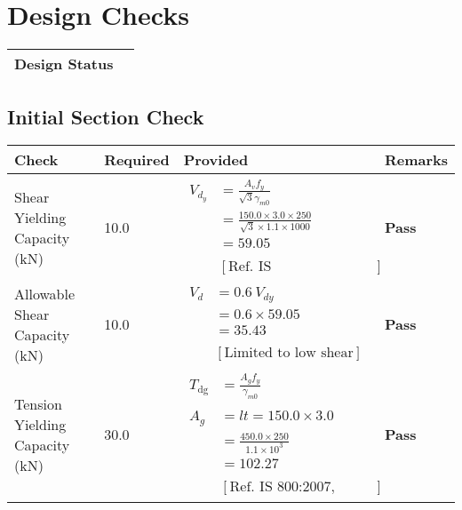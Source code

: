 \documentclass{article}%
\begin{document}
\section{Design Checks}%
\label{sec:DesignChecks}%
\renewcommand{\arraystretch}{1.2}%
\begin{tabularx}{\textwidth}{|>{\centering}p{12.5cm}|>{\centering\arraybackslash}X|}%
\hline%
\textbf{Design Status}&\cellcolor{Red}{\textbf{Fail}}\\%
\hline%
\end{tabularx}%
\subsection{Initial Section Check}%
\label{subsec:InitialSectionCheck}%
\renewcommand{\arraystretch}{1.2}%
\begin{longtable}{|p{4cm}|p{5cm}|p{5.5cm}|p{1.5cm}|}%
\hline%
\rowcolor{OsdagGreen}%
Check&Required&Provided&Remarks\\%
\hline%
\endhead%
\hline%
Shear Yielding Capacity (kN)&10.0&$\begin{aligned} V_{d_y} &= \frac{A_vf_y}{\sqrt{3}\gamma_{m0}}\\ &=\frac{150.0\times3.0\times250}{\sqrt{3} \times1.1 \times 1000}\\ &=59.05 \\ \\ & [\text{Ref. IS ~800:2007,~Cl.10.4.3}] \end{aligned}$&\textcolor{OsdagGreen}{ 
\textbf{Pass}
}\\%
\hline%
Allowable Shear Capacity (kN)&10.0&$\begin{aligned} V_{d} &= 0.6~V_{dy}\\ &=0.6 \times59.05\\ &=35.43\\ \\ & [\text{Limited to low shear}] \end{aligned}$&\textcolor{OsdagGreen}{ 
\textbf{Pass}
}\\%
\hline%
Tension Yielding Capacity (kN)&30.0&$\begin{aligned} T_{\text{dg}} &= \frac{A_g f_y}{\gamma_{m0}}\\ \\ A_{g} &= l t =150.0\times3.0\\ &=\frac{450.0\times250}{1.1\times 10^3}\\ &=102.27\\ \\ & [\text{Ref. IS 800:2007, Cl.6.2}] \end{aligned}$&\textcolor{OsdagGreen}{ 
\textbf{Pass}
}\\%
\hline%
\end{longtable}
\end{document}
